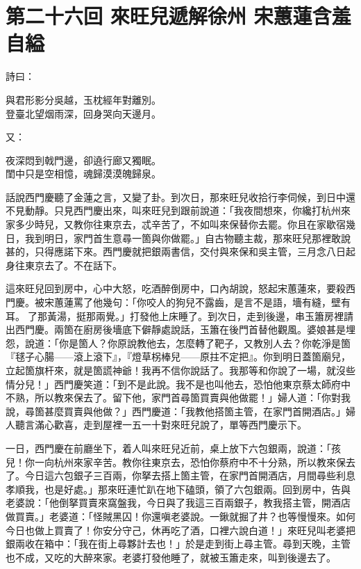 
\chapter*{第二十六回 來旺兒遞解徐州 宋蕙蓮含羞自縊}


詩曰：

\begin{myquote}
與君形影分吳越，玉枕經年對離別。\\登臺北望烟雨深，回身哭向天邊月。
\end{myquote}

又：

\begin{myquote}
夜深悶到戟門邊，卻遶行廊又獨眠。\\閨中只是空相憶，魂歸漠漠魄歸泉。
\end{myquote}

話說西門慶聽了金蓮之言，又變了卦。到次日，那來旺兒收拾行李伺候，到日中還不見動靜。只見西門慶出來，叫來旺兒到跟前說道：「我夜間想來，你纔打杭州來家多少時兒，又教你往東京去，忒辛苦了，不如叫來保替你去罷。你且在家歇宿幾日，我到明日，家門首生意尋一箇與你做罷。」自古物聽主裁，那來旺兒那裡敢說甚的，只得應諾下來。西門慶就把銀兩書信，交付與來保和吳主管，三月念八日起身往東京去了。不在話下。

這來旺兒回到房中，心中大怒，{}吃酒醉倒房中，口內胡說，怒起宋蕙蓮來，要殺西門慶。{}被宋蕙蓮罵了他幾句：「你咬人的狗兒不露齒，是言不是語，墻有縫，壁有耳。𠳹了那黃湯，挺那兩覺。」打發他上床睡了。到次日，走到後邊，串玉簫房裡請出西門慶。兩箇在廚房後墻底下僻靜處說話，玉簫在後門首替他觀風。婆娘甚是埋怨，說道：「你是箇人？你原說教他去，怎麼轉了靶子，又教別人去？你乾淨是箇『毬子心腸——滾上滾下』，{}『燈草柺棒兒——原拄不定把』。你到明日蓋箇廟兒，立起箇旗杆來，就是箇謊神爺！我再不信你說話了。我那等和你說了一場，就沒些情分兒！」{}西門慶笑道：「到不是此說。我不是也叫他去，恐怕他東京蔡太師府中不熟，所以教來保去了。留下他，家門首尋箇買賣與他做罷！」婦人道：「你對我說，尋箇甚麼買賣與他做？」西門慶道：「我教他搭箇主管，在家門首開酒店。」婦人聽言滿心歡喜，走到屋裡一五一十對來旺兒說了，{}單等西門慶示下。

一日，西門慶在前廳坐下，着人叫來旺兒近前，桌上放下六包銀兩，說道：「孩兒！你一向杭州來家辛苦。教你往東京去，恐怕你蔡府中不十分熟，所以教來保去了。今日這六包銀子三百兩，你拏去搭上箇主管，在家門首開酒店，月間尋些利息孝順我，也是好處。」那來旺連忙趴在地下磕頭，領了六包銀兩。回到房中，告與老婆說：「他倒拏買賣來窩盤我，今日與了我這三百兩銀子，教我搭主管，開酒店做買賣。」老婆道：「怪賊黑囚！你還嗔老婆說。一鍬就掘了井？也等慢慢來。如何今日也做上買賣了！你安分守己，休再吃了酒，口裡六說白道！」來旺兒叫老婆把銀兩收在箱中：「我在街上尋夥計去也！」於是走到街上尋主管。尋到天晚，主管也不成，又吃的大醉來家。老婆打發他睡了，就被玉簫走來，叫到後邊去了。

